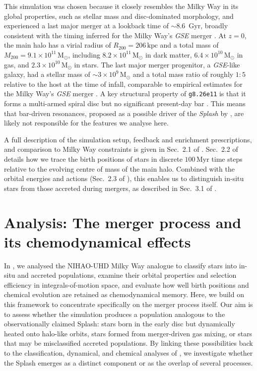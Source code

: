 \documentclass[fleqn,usenatbib]{mnras}
\begin{document}
This simulation was chosen because it closely resembles the Milky Way in its global properties, such as stellar mass and disc-dominated morphology, and experienced a last major merger at a lookback time of $\sim 8.6$~Gyr, broadly consistent with the timing inferred for the Milky Way's \textit{GSE} merger \citep{Helmi2018, Naidu2021}. At $z=0$, the main halo has a virial radius of $R_{200}=206\,\mathrm{kpc}$ and a total mass of $M_{200}=9.1\times10^{11}\,\mathrm{M_\odot}$, including $8.2\times10^{11}\,\mathrm{M_\odot}$ in dark matter, $6.4\times10^{10}\,\mathrm{M_\odot}$ in gas, and $2.3\times10^{10}\,\mathrm{M_\odot}$ in stars. The last major merger progenitor, a \textit{GSE}-like galaxy, had a stellar mass of $\sim 3\times10^9\,\mathrm{M_\odot}$ and a total mass ratio of roughly $1:5$ relative to the host at the time of infall, comparable to empirical estimates for the Milky Way's \textit{GSE} merger \citep[e.g.][]{Helmi2018, Naidu2021}.
A key structural property of \texttt{g8.26e11} is that it forms a multi-armed spiral disc but no significant present-day bar \citep{Buder2025}. This means that bar-driven resonances, proposed as a possible driver of the \textit{Splash} by \citet{Dillamore2022, Dillamore2023}, are likely not responsible for the features we analyse here.

A full description of the simulation setup, feedback and enrichment prescriptions, and comparison to Milky Way constraints is given in Sec.~2.1 of . Sec.~2.2 of  details how we trace the birth positions of stars in discrete $100\,\mathrm{Myr}$ time steps relative to the evolving centre of mass of the main halo. Combined with the orbital energies and actions (Sec.~2.3 of ), this enables us to distinguish in-situ stars from those accreted during mergers, as described in Sec.~3.1 of .

\section{Analysis: The merger process and its chemodynamical effects} \label{sec:analysis}

In , we analysed the NIHAO-UHD Milky Way analogue to classify stars into in-situ and accreted populations, examine their orbital properties and selection efficiency in integrals-of-motion space, and evaluate how well birth positions and chemical evolution are retained as chemodynamical memory. Here, we build on this framework to concentrate specifically on the merger process itself. Our aim is to assess whether the simulation produces a population analogous to the observationally claimed Splash: stars born in the early disc but dynamically heated onto halo-like orbits, stars formed from merger-driven gas mixing, or stars that may be misclassified accreted populations. By linking these possibilities back to the classification, dynamical, and chemical analyses of , we investigate whether the Splash emerges as a distinct component or as the overlap of several processes.
\end{document}
